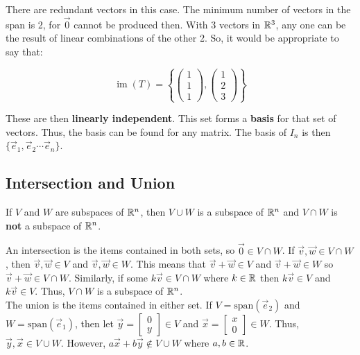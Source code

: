 There are redundant vectors in this case. The minimum number of vectors in the span is 2, 
for $\vec{0}$ cannot be produced then. With 3 vectors in $\mathbb{R}^3$, any one can be the result of linear combinations of the other 2.
So, it would be appropriate to say that:

\[\operatorname{im}(T)=\left\{\left(\begin{array}{l}
    1 \\
    1 \\
    1
    \end{array}\right),\left(\begin{array}{l}
    1 \\
    2 \\
    3
    \end{array}\right)\right\}\]

These are then \textbf{linearly independent}. This set forms a \textbf{basis} for that set of vectors.
Thus, the basis can be found for any matrix. The basis of $I_n$ is then $\{\vec{e}_1,\vec{e}_2\cdots \vec{e}_n\}$.

\subsection{Intersection and Union}

\begin{framed}
    \noindent If $V$ and $W$ are subspaces of $\mathbb{R}^n$, then $V\cup W$ 
    is a subspace of $\mathbb{R}^n$ and $V\cap W$ is \textbf{not} a subspace of $\mathbb{R}^n$.
\end{framed}

\noindent
An intersection is the items contained in both sets, so $\vec{0}\in V\cap W$.
If $\vec{v},\vec{w}\in V\cap W$, then $\vec{v},\vec{w}\in V$ and $\vec{v},\vec{w}\in W$. This means that
$\vec{v}+\vec{w}\in V$ and $\vec{v}+\vec{w}\in W$ so $\vec{v}+\vec{w}\in V\cap W$.
Similarly, if some $k\vec{v}\in V\cap W$ where $k\in \mathbb{R}$ then $k\vec{v}\in V$ and $k\vec{v}\in V$. 
Thus, $V\cap W$ is a subspace of $\mathbb{R}^n$.\\

\noindent
The union is the items contained in either set.
If $V=\mathrm{span}(\vec{e}_2)$ and $W=\mathrm{span}(\vec{e}_1)$, then let $\vec{y}=\begin{bmatrix}0\\ y\end{bmatrix}\in V$
and $\vec{x}=\begin{bmatrix}x\\ 0\end{bmatrix}\in W$. Thus, $\vec{y},\vec{x}\in V\cup W$. However,
$a\vec{x}+b\vec{y}\notin V\cup W$ where $a,b\in \mathbb{R}$.